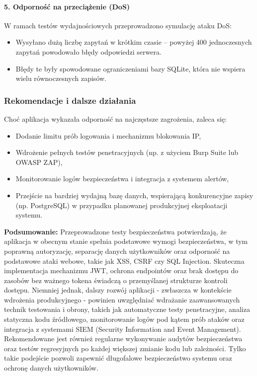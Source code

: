 \paragraph{5. Odporność na przeciążenie (DoS)}
W ramach testów wydajnościowych przeprowadzono symulację ataku DoS:
\begin{itemize}
    \item Wysyłano dużą liczbę zapytań w krótkim czasie – powyżej 400 jednoczesnych zapytań powodowało błędy odpowiedzi serwera.
    \item Błędy te były spowodowane ograniczeniami bazy SQLite, która nie wspiera wielu równoczesnych zapisów.
\end{itemize}

\subsubsection{Rekomendacje i dalsze działania}
Choć aplikacja wykazała odporność na najczęstsze zagrożenia, zaleca się:
\begin{itemize}
    \item Dodanie limitu prób logowania i mechanizmu blokowania IP,
    \item Wdrożenie pełnych testów penetracyjnych (np. z użyciem Burp Suite \cite{BurpSuite} lub OWASP ZAP\cite{ZAP}),
    \item Monitorowanie logów bezpieczeństwa i integracja z systemem alertów,
    \item Przejście na bardziej wydajną bazę danych, wspierającą konkurencyjne zapisy (np. PostgreSQL) w przypadku planowanej produkcyjnej eksploatacji systemu.
\end{itemize}

\textbf{Podsumowanie:} Przeprowadzone testy bezpieczeństwa potwierdzają, że aplikacja w obecnym stanie spełnia podstawowe wymogi bezpieczeństwa, w tym poprawną autoryzację, separację danych użytkowników oraz odporność na podstawowe ataki webowe, takie jak XSS, CSRF czy SQL Injection. Skuteczna implementacja mechanizmu JWT, ochrona endpointów oraz brak dostępu do zasobów bez ważnego tokena świadczą o przemyślanej strukturze kontroli dostępu. Niemniej jednak, dalszy rozwój aplikacji - zwłaszcza w kontekście wdrożenia produkcyjnego - powinien uwzględniać wdrażanie zaawansowanych technik testowania i obrony, takich jak automatyczne testy penetracyjne, analiza statyczna kodu źródłowego, monitorowanie logów pod kątem prób ataków oraz integracja z systemami SIEM (Security Information and Event Management). Rekomendowane jest również regularne wykonywanie audytów bezpieczeństwa oraz testów regresyjnych po każdej większej zmianie kodu lub zależności. Tylko takie podejście pozwoli zapewnić długofalowe bezpieczeństwo systemu oraz ochronę danych użytkowników.